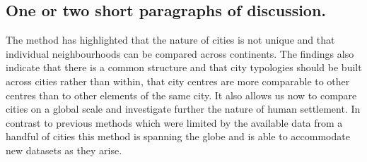 \documentclass{nature}
\begin{document}
\subsection{One or two short paragraphs of discussion.}
The method has highlighted that the nature of cities is not unique and that individual neighbourhoods can be compared across continents. The findings also indicate that there is a common structure and that city typologies should be built across cities rather than within, that city centres are more comparable to other centres than to other elements of the same city.
It also allows us now to compare cities on a global scale and investigate further the nature of human settlement. In contrast to previous methods which were limited by the available data from a handful of cities this method is spanning the globe and is able to accommodate new datasets as they arise.  
\end{document}
